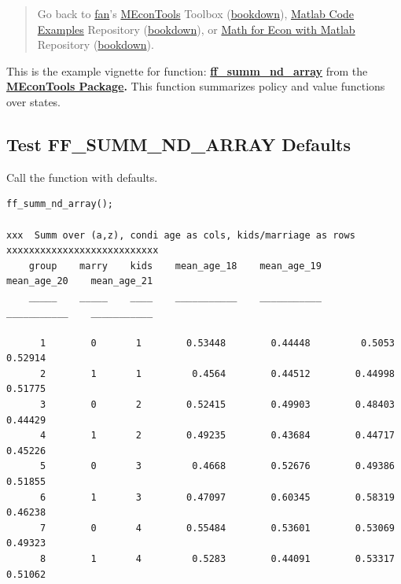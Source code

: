\documentclass[
]{book}
\begin{document}
\begin{quote}
Go back to \href{http://fanwangecon.github.io/}{fan}'s \href{https://fanwangecon.github.io/MEconTools/}{MEconTools} Toolbox (\href{https://fanwangecon.github.io/MEconTools/bookdown}{bookdown}), \href{https://fanwangecon.github.io/M4Econ/}{Matlab Code Examples} Repository (\href{https://fanwangecon.github.io/M4Econ/bookdown}{bookdown}), or \href{https://fanwangecon.github.io/Math4Econ/}{Math for Econ with Matlab} Repository (\href{https://fanwangecon.github.io/Math4Econ/bookdown}{bookdown}).
\end{quote}

This is the example vignette for function:
\href{https://github.com/FanWangEcon/MEconTools/blob/master/MEconTools/summ/ff_summ_nd_array.m}{\textbf{ff\_summ\_nd\_array}}
from the \href{https://fanwangecon.github.io/MEconTools/}{\textbf{MEconTools
Package}}\textbf{.} This function
summarizes policy and value functions over states.

\hypertarget{test-ff_summ_nd_array-defaults}{%
\subsection{Test FF\_SUMM\_ND\_ARRAY Defaults}\label{test-ff_summ_nd_array-defaults}}

Call the function with defaults.

\begin{verbatim}
ff_summ_nd_array();

xxx  Summ over (a,z), condi age as cols, kids/marriage as rows  xxxxxxxxxxxxxxxxxxxxxxxxxxx
    group    marry    kids    mean_age_18    mean_age_19    mean_age_20    mean_age_21
    _____    _____    ____    ___________    ___________    ___________    ___________

      1        0       1        0.53448        0.44448         0.5053        0.52914  
      2        1       1         0.4564        0.44512        0.44998        0.51775  
      3        0       2        0.52415        0.49903        0.48403        0.44429  
      4        1       2        0.49235        0.43684        0.44717        0.45226  
      5        0       3         0.4668        0.52676        0.49386        0.51855  
      6        1       3        0.47097        0.60345        0.58319        0.46238  
      7        0       4        0.55484        0.53601        0.53069        0.49323  
      8        1       4         0.5283        0.44091        0.53317        0.51062  
\end{verbatim}
\end{document}
